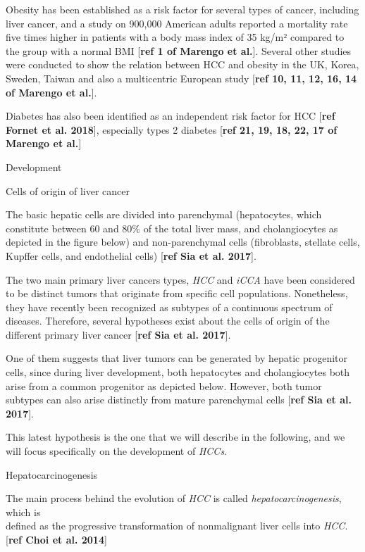 \documentclass[]{article}
\begin{document}
Obesity has been established as a risk factor for several types of
cancer, including liver cancer, and a study on 900,000 American adults
reported a mortality rate five times higher in patients with a body mass
index of 35 kg/m² compared to the group with a normal BMI {[}\textbf{ref
1 of Marengo et al.}{]}. Several other studies were conducted to show
the relation between HCC and obesity in the UK, Korea, Sweden, Taiwan
and also a multicentric European study {[}\textbf{ref 10, 11, 12, 16, 14
of Marengo et al.}{]}.

Diabetes has also been identified as an independent risk factor for HCC
{[}\textbf{ref Fornet et al. 2018}{]}, especially types 2 diabetes
{[}\textbf{ref 21, 19, 18, 22, 17 of Marengo et al.}{]}

\protect\hypertarget{anchor-3}{}{}Development

\protect\hypertarget{anchor-4}{}{}Cells of origin of liver cancer

The basic hepatic cells are divided into parenchymal (hepatocytes, which
constitute between 60 and 80\% of the total liver mass, and
cholangiocytes as depicted in the figure below) and non-parenchymal
cells (fibroblasts, stellate cells, Kupffer cells, and endothelial
cells) {[}\textbf{ref Sia et al. 2017}{]}.

The two main primary liver cancers types, \emph{HCC} and \emph{iCCA}
have been considered to be distinct tumors that originate from specific
cell populations. Nonetheless, they have recently been recognized as
subtypes of a continuous spectrum of diseases. Therefore, several
hypotheses exist about the cells of origin of the different primary
liver cancer {[}\textbf{ref Sia et al. 2017}{]}.

One of them suggests that liver tumors can be generated by hepatic
progenitor cells, since during liver development, both hepatocytes and
cholangiocytes both arise from a common progenitor as depicted below.
However, both tumor subtypes can also arise distinctly from mature
parenchymal cells {[}\textbf{ref Sia et al. 2017}{]}.

This latest hypothesis is the one that we will describe in the
following, and we will focus specifically on the development of
\emph{HCCs}.

\protect\hypertarget{anchor-5}{}{}Hepatocarcinogenesis

The main process behind the evolution of \emph{HCC} is called
\emph{hepatocarcinogenesis}, which is\\
defined as the progressive\emph{ }transformation of nonmalignant liver
cells into \emph{HCC}. {[}\textbf{ref Choi et al. 2014}{]}
\end{document}
